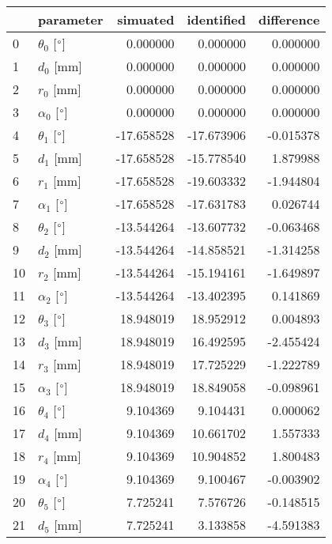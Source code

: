 \documentclass{standalone}%
\begin{document}
%
\normalsize%
\begin{tabular}{llrrr}
\toprule
{} &                 parameter &   simuated & identified & difference \\
\midrule
0  &  $\theta_{0}$ [$\degree$] &   0.000000 &   0.000000 &   0.000000 \\
1  &              $d_{0}$ [mm] &   0.000000 &   0.000000 &   0.000000 \\
2  &              $r_{0}$ [mm] &   0.000000 &   0.000000 &   0.000000 \\
3  &  $\alpha_{0}$ [$\degree$] &   0.000000 &   0.000000 &   0.000000 \\
4  &  $\theta_{1}$ [$\degree$] & -17.658528 & -17.673906 &  -0.015378 \\
5  &              $d_{1}$ [mm] & -17.658528 & -15.778540 &   1.879988 \\
6  &              $r_{1}$ [mm] & -17.658528 & -19.603332 &  -1.944804 \\
7  &  $\alpha_{1}$ [$\degree$] & -17.658528 & -17.631783 &   0.026744 \\
8  &  $\theta_{2}$ [$\degree$] & -13.544264 & -13.607732 &  -0.063468 \\
9  &              $d_{2}$ [mm] & -13.544264 & -14.858521 &  -1.314258 \\
10 &              $r_{2}$ [mm] & -13.544264 & -15.194161 &  -1.649897 \\
11 &  $\alpha_{2}$ [$\degree$] & -13.544264 & -13.402395 &   0.141869 \\
12 &  $\theta_{3}$ [$\degree$] &  18.948019 &  18.952912 &   0.004893 \\
13 &              $d_{3}$ [mm] &  18.948019 &  16.492595 &  -2.455424 \\
14 &              $r_{3}$ [mm] &  18.948019 &  17.725229 &  -1.222789 \\
15 &  $\alpha_{3}$ [$\degree$] &  18.948019 &  18.849058 &  -0.098961 \\
16 &  $\theta_{4}$ [$\degree$] &   9.104369 &   9.104431 &   0.000062 \\
17 &              $d_{4}$ [mm] &   9.104369 &  10.661702 &   1.557333 \\
18 &              $r_{4}$ [mm] &   9.104369 &  10.904852 &   1.800483 \\
19 &  $\alpha_{4}$ [$\degree$] &   9.104369 &   9.100467 &  -0.003902 \\
20 &  $\theta_{5}$ [$\degree$] &   7.725241 &   7.576726 &  -0.148515 \\
21 &              $d_{5}$ [mm] &   7.725241 &   3.133858 &  -4.591383 \\

\end{tabular}
\end{document}
